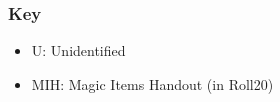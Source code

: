 \documentclass[a4paper,11pt]{article}
\begin{document}
\subsubsection*{Key}
\begin{itemize}
    \item U: Unidentified
    \item MIH: Magic Items Handout (in Roll20)
\end{itemize}
\end{document}
